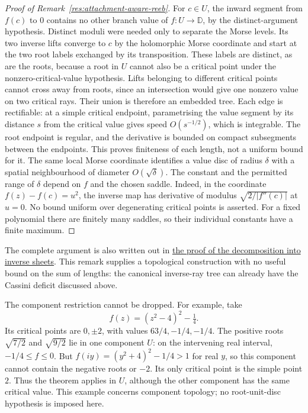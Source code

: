 \begin{proof}[Proof of Remark~\ref{res:attachment-aware-reeb}]
For $c\in U$, the inward segment from $f(c)$ to $0$ contains no other
branch value of $f:U\to\mathbb D$, by the distinct-argument hypothesis.
Distinct moduli were needed only to separate the Morse levels. Its two
inverse lifts converge to $c$ by the holomorphic Morse coordinate and
start at the two root labels exchanged by its transposition. These labels
are distinct, as are the roots, because a root in $U$ cannot also be a
critical point under the nonzero-critical-value hypothesis. Lifts belonging to
different critical points cannot cross away from roots, since an intersection
would give one nonzero value on two critical rays. Their union is therefore
an embedded tree. Each edge is rectifiable: at a simple critical endpoint,
parametrising the value segment by its distance $s$ from the critical value
gives speed $O(s^{-1/2})$, which is integrable. The root endpoint is regular,
and the derivative is bounded on compact subsegments between the endpoints.
This proves finiteness of each length, not a uniform bound for it.
The same local Morse coordinate identifies a value disc of
radius $\delta$ with a spatial neighbourhood of diameter
$O(\sqrt\delta)$. The constant and the permitted range of $\delta$
depend on $f$ and the chosen saddle. Indeed, in the coordinate
$f(z)-f(c)=u^2$, the inverse map has derivative of modulus
$\sqrt{2/|f''(c)|}$ at $u=0$. No bound uniform over degenerating
critical points is asserted. For a fixed polynomial there are finitely
many saddles, so their individual constants have a finite maximum.
\end{proof}

The complete argument is also written out in
\href{https://github.com/wcook04/plectis-erdos/blob/a729f05c40398663fd586c9da487ad874d898639/research_corpus/Erdos1041/AttachmentAwareReeb.md}{the proof of the decomposition into inverse sheets}.
This remark supplies a topological construction with no useful bound
on the sum of lengths: the canonical inverse-ray tree can already have
the Cassini deficit discussed above.

The component restriction cannot be dropped. For example, take
\[
 f(z)=(z^2-4)^2-\tfrac14.
\]
Its critical points are $0,\pm2$, with values $63/4,-1/4,-1/4$.
The positive roots $\sqrt{7/2}$ and $\sqrt{9/2}$ lie in one component
$U$: on the intervening real interval, $-1/4\le f\le0$.
But $f(iy)=(y^2+4)^2-1/4>1$ for real $y$, so this component cannot
contain the negative roots or $-2$. Its only critical point is the simple
point $2$. Thus the theorem applies in $U$, although the other component
has the same critical value. This example concerns component topology;
no root-unit-disc hypothesis is imposed here.

